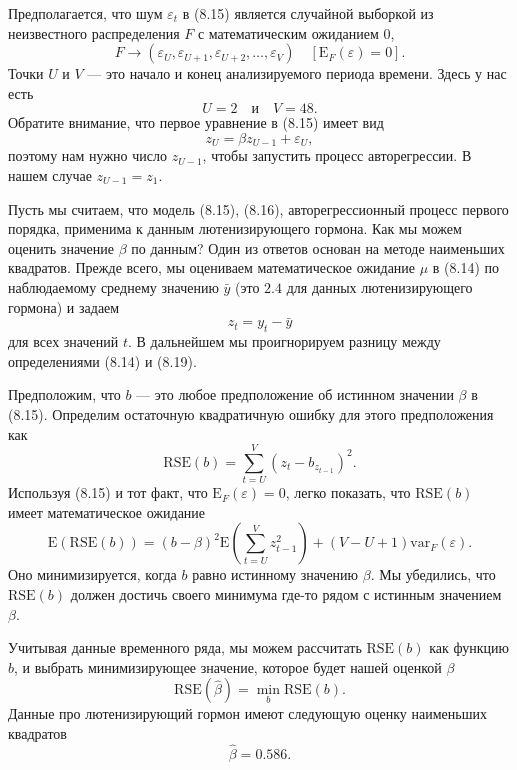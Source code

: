 Предполагается, что шум $\varepsilon_t$ в (8.15) является случайной выборкой из неизвестного распределения $F$ с математическим ожиданием $0$,
\begin{equation}
	F \to (\varepsilon_U, \varepsilon_{U+1}, \varepsilon_{U+2}, \ldots, \varepsilon_V) \quad [\text{E}_F(\varepsilon) = 0].
\end{equation}
Точки $U$ и $V$ --- это начало и конец анализируемого периода времени. Здесь у нас есть
\begin{equation}
	U = 2 \quad \text{и} \quad V = 48.
\end{equation}
Обратите внимание, что первое уравнение в (8.15) имеет вид
\begin{equation}
	z_U = \beta z_{U-1} + \varepsilon_U,
\end{equation}
поэтому нам нужно число $z_{U-1}$, чтобы запустить процесс авторегрессии. В нашем случае $z_{U-1} = z_1$. 

Пусть мы считаем, что модель (8.15), (8.16), авторегрессионный процесс первого порядка, применима к данным лютенизирующего гормона. Как мы можем оценить значение $\beta$ по данным? Один из ответов основан на методе наименьших квадратов. Прежде всего, мы оцениваем математическое ожидание $\mu$ в (8.14) по наблюдаемому среднему значению $\bar{y}$ (это $2.4$ для данных лютенизирующего гормона) и задаем
\begin{equation}
	z_t = y_t - \bar{y}
\end{equation}
для всех значений $t$. В дальнейшем мы проигнорируем разницу между определениями (8.14) и (8.19). 

Предположим, что $b$ --- это любое предположение об истинном значении $\beta$ в (8.15). Определим остаточную квадратичную ошибку для этого предположения как
\begin{equation}
	\text{RSE}(b) = \sum_{t=U}^{V} (z_t - b_{z_{t-1}})^2.
\end{equation}
Используя (8.15) и тот факт, что $\text{E}_F(\varepsilon) = 0$, легко показать, что $\text{RSE}(b)$ имеет математическое ожидание 
\begin{equation*}
	\text{E}\left(\text{RSE}(b)\right) = (b-\beta)^2 \text{E} \left(\sum_{t=U}^{V} z_{t-1}^2 \right) + (V-U+1) \text{var}_F(\varepsilon).
\end{equation*}
 Оно минимизируется, когда $b$ равно истинному значению $\beta$. Мы убедились, что $\text{RSE}(b)$ должен достичь своего минимума где-то рядом с истинным значением $\beta$. 

Учитывая данные временного ряда, мы можем рассчитать $\text{RSE}(b)$ как функцию $b$, и выбрать минимизирующее значение, которое будет нашей оценкой $\beta$
\begin{equation}
	\text{RSE}(\hat{\beta}) = \min_b \text{RSE}(b).
\end{equation}
Данные про лютенизирующий гормон имеют следующую оценку наименьших квадратов
\begin{equation}
	\hat{\beta} = 0.586.
\end{equation}

